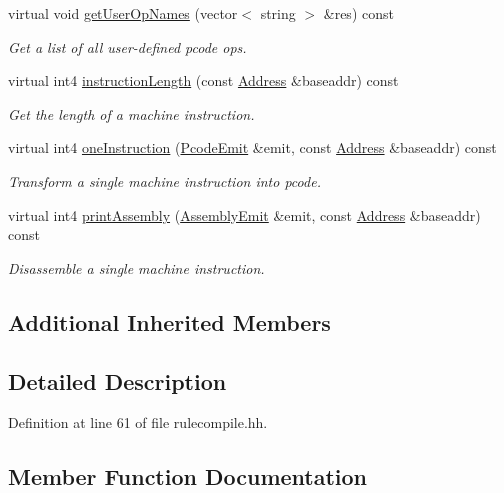 \begin{DoxyCompactItemize}
virtual void \mbox{\hyperlink{class_dummy_translate_aa60999d42adf6fddc6fb57437ffb79c3}{get\+User\+Op\+Names}} (vector$<$ string $>$ \&res) const
\begin{DoxyCompactList}\small\item\em Get a list of all {\itshape user-\/defined} pcode ops. \end{DoxyCompactList}\item 
virtual int4 \mbox{\hyperlink{class_dummy_translate_aaf7ead6c5f833e5558319725ad66fe28}{instruction\+Length}} (const \mbox{\hyperlink{class_address}{Address}} \&baseaddr) const
\begin{DoxyCompactList}\small\item\em Get the length of a machine instruction. \end{DoxyCompactList}\item 
virtual int4 \mbox{\hyperlink{class_dummy_translate_a429150e7328be97b17b7ee7211c23841}{one\+Instruction}} (\mbox{\hyperlink{class_pcode_emit}{Pcode\+Emit}} \&emit, const \mbox{\hyperlink{class_address}{Address}} \&baseaddr) const
\begin{DoxyCompactList}\small\item\em Transform a single machine instruction into pcode. \end{DoxyCompactList}\item 
virtual int4 \mbox{\hyperlink{class_dummy_translate_a7c3c565169bd97e37b568985c757ffdd}{print\+Assembly}} (\mbox{\hyperlink{class_assembly_emit}{Assembly\+Emit}} \&emit, const \mbox{\hyperlink{class_address}{Address}} \&baseaddr) const
\begin{DoxyCompactList}\small\item\em Disassemble a single machine instruction. \end{DoxyCompactList}\end{DoxyCompactItemize}
\subsection*{Additional Inherited Members}


\subsection{Detailed Description}


Definition at line 61 of file rulecompile.\+hh.



\subsection{Member Function Documentation}
\mbox{\label{class_dummy_translate_a31a861eddfd5416506d306b9578b2b2a}} 
